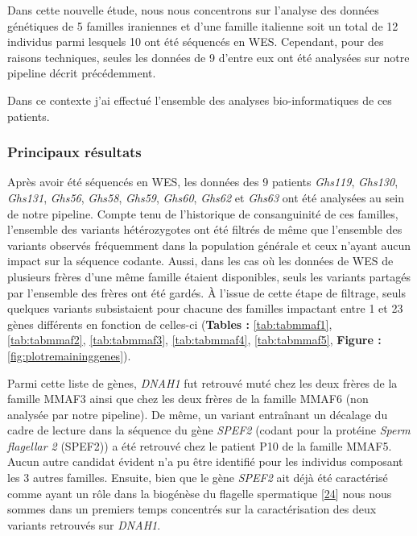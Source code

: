 \documentclass[12pt,a4paper,twoside]{ugathesis}
\begin{document}
Dans cette nouvelle étude, nous nous concentrons sur l'analyse des
données génétiques de 5 familles iraniennes et d'une famille italienne
soit un total de 12 individus parmi lesquels 10 ont été séquencés en
WES. Cependant, pour des raisons techniques, seules les données de 9
d'entre eux ont été analysées sur notre pipeline décrit précédemment.

Dans ce contexte j'ai effectué l'ensemble des analyses bio-informatiques
de ces patients.

\newpage



\newpage

\subsubsection{Principaux résultats}\label{principaux-resultats-2}

Après avoir été séquencés en WES, les données des 9 patients
\emph{Ghs119}, \emph{Ghs130}, \emph{Ghs131}, \emph{Ghs56}, \emph{Ghs58},
\emph{Ghs59}, \emph{Ghs60}, \emph{Ghs62} et \emph{Ghs63} ont été
analysées au sein de notre pipeline. Compte tenu de l'historique de
consanguinité de ces familles, l'ensemble des variants hétérozygotes ont
été filtrés de même que l'ensemble des variants observés fréquemment
dans la population générale et ceux n'ayant aucun impact sur la séquence
codante. Aussi, dans les cas où les données de WES de plusieurs frères
d'une même famille étaient disponibles, seuls les variants partagés par
l'ensemble des frères ont été gardés. À l'issue de cette étape de
filtrage, seuls quelques variants subsistaient pour chacune des familles
impactant entre 1 et 23 gènes différents en fonction de celles-ci
(\textbf{Tables :} \ref{tab:tabmmaf1}, \ref{tab:tabmmaf2},
\ref{tab:tabmmaf3}, \ref{tab:tabmmaf4}, \ref{tab:tabmmaf5},
\textbf{Figure : }\ref{fig:plotremaininggenes}).

Parmi cette liste de gènes, \emph{DNAH1} fut retrouvé muté chez les deux
frères de la famille MMAF3 ainsi que chez les deux frères de la famille
MMAF6 (non analysée par notre pipeline). De même, un variant entraînant
un décalage du cadre de lecture dans la séquence du gène \emph{SPEF2}
(codant pour la protéine \emph{Sperm flagellar 2} (SPEF2)) a été
retrouvé chez le patient P10 de la famille MMAF5. Aucun autre candidat
évident n'a pu être identifié pour les individus composant les 3 autres
familles. Ensuite, bien que le gène \emph{SPEF2} ait déjà été
caractérisé comme ayant un rôle dans la biogénèse du flagelle
spermatique {[}\protect\hyperlink{ref-Lehti2017}{24}{]} nous nous sommes
dans un premiers temps concentrés sur la caractérisation des deux
variants retrouvés sur \emph{DNAH1}.
\end{document}
